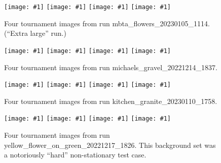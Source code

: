 \documentclass[letterpaper]{article}
\newcommand{\runID}{\footnotesize}
\newcommand{\igfour}[1]{\texttt{[image: \#1]}}
\begin{document}
\begin{figure}
    \igfour{20230106_step_11019.png}
    \hfill
    \igfour{20230106_step_11204.png}
    \hfill
    \igfour{20230106_step_11689.png}
    \hfill
    \igfour{20230106_step_11995.png}
    \caption{Four tournament images from run {\runID mbta\_flowers\_20230105\_1114}. (“Extra large” run.)}
    \label{fig:mbta_flowers_4x}
\end{figure}

\begin{figure}
    \igfour{20221215_step_5867.png}
    \hfill
    \igfour{20221215_step_5892.png}
    \hfill
    \igfour{20221215_step_6830.png}
    \hfill
    \igfour{20221215_step_6916.png}
    \caption{Four tournament images from run {\runID michaels\_gravel\_20221214\_1837}.}
    \label{fig:michaels_gravel_4x}
\end{figure}

\begin{figure}
    \igfour{20230111_step_5576.png}
    \hfill
    \igfour{20230111_step_6159.png}
    \hfill
    \igfour{20230111_step_6303.png}
    \hfill
    \igfour{20230111_step_6726.png}
    \caption{Four tournament images from run {\runID kitchen\_granite\_20230110\_1758}.}
    \label{fig:kitchen_granite_4x}
\end{figure}

\begin{figure}
    \igfour{20221218_step_5396.png}
    \hfill
    \igfour{20221218_step_5641.png}
    \hfill
    \igfour{20221218_step_5947.png}
    \hfill
    \igfour{20221218_step_6753.png}
    \caption{Four tournament images from run {\runID yellow\_flower\_on\_green\_20221217\_1826}. This background set was a notoriously “hard” non-stationary test case.}
    \label{fig:yellow_flower_4x}
\end{figure}
\end{document}

